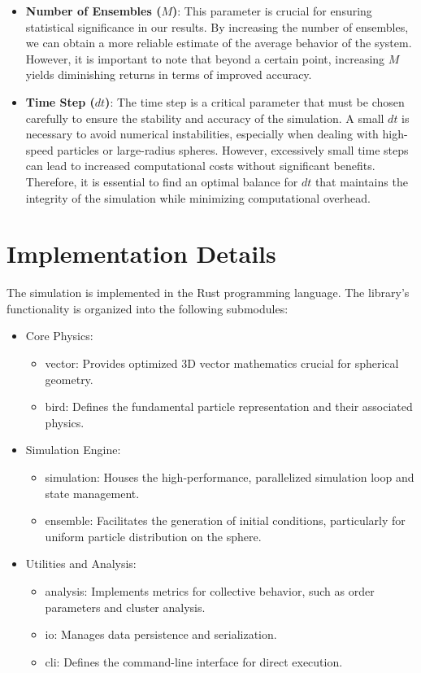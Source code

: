 \documentclass[12pt,a4paper]{article}
\begin{document}
\begin{itemize}
    \item \textbf{Number of Ensembles ($M$)}: 
    This parameter is crucial for ensuring statistical significance in our results. By increasing the number of ensembles, we can obtain a more reliable estimate of the average behavior of the system. However, it is important to note that beyond a certain point, increasing \(M\) yields diminishing returns in terms of improved accuracy.
    \item \textbf{Time Step ($dt$)}: 
    The time step is a critical parameter that must be chosen carefully to ensure the stability and accuracy of the simulation. A small \(dt\) is necessary to avoid numerical instabilities, especially when dealing with high-speed particles or large-radius spheres. However, excessively small time steps can lead to increased computational costs without significant benefits. Therefore, it is essential to find an optimal balance for \(dt\) that maintains the integrity of the simulation while minimizing computational overhead.
\end{itemize}

\section{Implementation Details}
The simulation is implemented in the Rust programming language. The library's functionality is organized into the following submodules:
\begin{itemize}
    \item Core Physics: \begin{itemize}
        \item vector: Provides optimized 3D vector mathematics crucial for spherical geometry.
        \item bird: Defines the fundamental particle representation and their associated physics.
    \end{itemize}
    \item Simulation Engine: \begin{itemize}
        \item simulation: Houses the high-performance, parallelized simulation loop and state management.
        \item ensemble: Facilitates the generation of initial conditions, particularly for uniform particle distribution on the sphere.
    \end{itemize}
    \item Utilities and Analysis: \begin{itemize}
        \item analysis: Implements metrics for collective behavior, such as order parameters and cluster analysis.
        \item io: Manages data persistence and serialization.
        \item cli: Defines the command-line interface for direct execution.
    \end{itemize}
\end{itemize}
\end{document}
